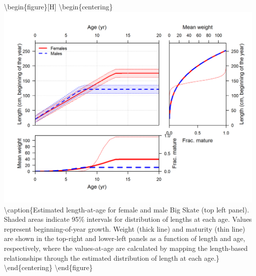 \documentclass[12pt,]{article}
\begin{document}
\textbackslash{}begin\{figure\}{[}H{]}
\textbackslash{}begin\{centering\}
\includegraphics{r4ss/plots_mod1/bio3_sizeatage_plus_WT_and_MAT.png}
\textbackslash{}caption\{Estimated length-at-age for female and male Big
Skate (top left panel). Shaded areas indicate 95\% intervals for
distribution of lengths at each age. Values represent beginning-of-year
growth. Weight (thick line) and maturity (thin line) are shown in the
top-right and lower-left panels as a function of length and age,
respectively, where the values-at-age are calculated by mapping the
length-based relationships through the estimated distribution of length
at each age.\}\label{fig:growth} \textbackslash{}end\{centering\}
\textbackslash{}end\{figure\}

\FloatBarrier
\end{document}
